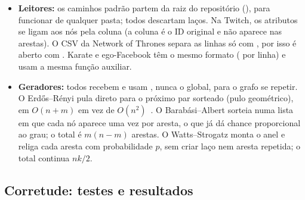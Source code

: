 \begin{itemize}[leftmargin=*]
        decrementa o contador. Os nós continuam no grafo. Quem usa é o Watts--Strogatz.
  \item \textbf{Leitores:} os caminhos padrão partem da raiz do repositório (), para
        funcionar de qualquer pasta; todos descartam laços. Na Twitch, os atributos se ligam aos nós
        pela coluna  (a coluna  é o ID original e não aparece nas arestas).
        O CSV da Network of Thrones separa as linhas só com , por isso é
        aberto com . Karate e ego-Facebook têm o mesmo formato ( por
        linha) e usam a mesma função auxiliar.
  \item \textbf{Geradores:} todos recebem  e usam , nunca o
         global, para o grafo se repetir. O Erdős--Rényi pula direto para o próximo par
        sorteado (pulo geométrico), em $O(n+m)$ em vez de $O(n^2)$~\cite{batagelj2005}. O
        Barabási--Albert sorteia numa lista em que cada nó aparece uma vez por aresta, o que já dá
        chance proporcional ao grau; o total é $m(n-m)$ arestas. O Watts--Strogatz monta o anel e
        religa cada aresta com probabilidade $p$, sem criar laço nem aresta repetida; o total
        continua $n k / 2$.
\end{itemize}

\subsection{Corretude: testes e resultados}


